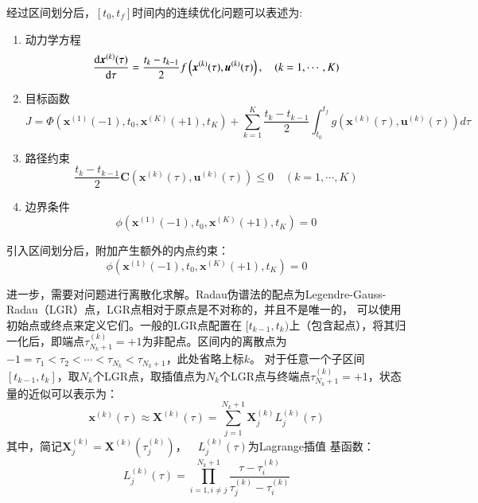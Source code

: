 经过区间划分后，$ [t_0,t_f] $时间内的连续优化问题可以表述为:
\begin{enumerate}
	\item 动力学方程
	      \begin{equation}
		      \frac{\mathop{}\!\mathrm{d} \boldsymbol{x}^{(k)}(\tau)}{\mathop{}\!\mathrm{d} \tau}=\frac{t_{k}-t_{k-1}}{2} f\left(\boldsymbol{x}^{(k)}(\tau), \boldsymbol{u}^{(k)}(\tau)\right), \quad(k=1, \cdots, K)
	      \end{equation}
	\item 目标函数
	      \begin{equation}
		      J=\Phi\left(\boldsymbol{x}^{(1)}(-1), t_{0}, \boldsymbol{x}^{(K)}(+1), t_{K}\right)+\sum_{k=1}^{K} \frac{t_{k}-t_{k-1}}{2} \int_{t_{0}}^{t_{f}} g\left(\boldsymbol{x}^{(k)}(\tau), \boldsymbol{u}^{(k)}(\tau)\right) d \tau
	      \end{equation}
	\item 路径约束
	      \begin{equation}
		      \frac{t_{k}-t_{k-1}}{2} \boldsymbol{C}\left(\boldsymbol{x}^{(k)}(\tau), \boldsymbol{u}^{(k)}(\tau)\right) \leq 0 \quad(k=1, \cdots, K)
	      \end{equation}
	\item 边界条件
	      \begin{equation}
		      \phi\left(\boldsymbol{x}^{(1)}(-1), t_{0}, \boldsymbol{x}^{(K)}(+1), t_{K}\right)=0
	      \end{equation}
\end{enumerate}

引入区间划分后，附加产生额外的内点约束：
\begin{equation}
	\phi\left(\boldsymbol{x}^{(1)}(-1), t_{0}, \boldsymbol{x}^{(K)}(+1), t_{K}\right)=0
\end{equation}

进一步，需要对问题进行离散化求解。Radau伪谱法的配点为Legendre-Gauss-Radau（LGR）点，LGR点相对于原点是不对称的，并且不是唯一的，
可以使用初始点或终点来定义它们。一般的LGR点配置在 $ [t_{k-1},t_k) $上（包含起点），将其归一化后，即端点$ \tau_{N_k+1}^{(k)}=+1 $为非配点。区间内的离散点为$ -1=\tau_1<\tau_2<\cdots<\tau_{N_k}<\tau_{N_k+1} $，此处省略上标$ k $。
对于任意一个子区间$  [t_{k-1},t_k] $，取$ N_k $个LGR点，取插值点为$ N_k $个LGR点与终端点$ \tau_{N_k+1}^{(k)}=+1 $，状态量的近似可以表示为：
\begin{equation}
	\boldsymbol{x}^{(k)}(\tau) \approx \boldsymbol{X}^{(k)}(\tau)=\sum_{j=1}^{N_{k}+1} \boldsymbol{X}_{j}^{(k)} L_{j}^{(k)}(\tau)
	\label{eq:state}
\end{equation}
其中，简记$ \boldsymbol{X}_{j}^{(k)}=\boldsymbol{X}^{(k)}\left(\tau_{j}^{(k)}\right)$，$ \quad L_{j}^{(k)}(\tau) $为Lagrange插值
基函数：
\begin{equation}
	L_{j}^{(k)}(\tau)=\prod_{i=1, i \neq j}^{N_{k}+1} \frac{\tau-\tau_{i}^{(k)}}{\tau_{j}^{(k)}-\tau_{i}^{(k)}}
\end{equation}

